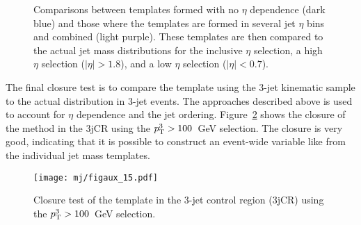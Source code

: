 \begin{figure}[!ht]
  \centering
  
    
  \caption{Comparisons between templates formed with no $\eta$ dependence (dark blue) and those where the templates are formed in several jet $\eta$ bins and combined (light purple). These templates are then compared to the actual jet mass distributions for the
            inclusive $\eta$ selection, 
            a high $\eta$ selection ($|\eta|>1.8$), and
            a low $\eta$ selection ($|\eta|<0.7$).
          }
           
  \label{fig:search:search:background:closure:eta}
\end{figure} 

The final closure test is to compare the \MJ template using the 3-jet kinematic sample to the actual \MJ distribution in 3-jet events. The approaches described above is used to account for $\eta$ dependence and the jet ordering. Figure~\ref{fig:search:search:background:closure:MJ} shows the closure of the method in the 3jCR using the $p_{\text{T}}^{3}>100$~GeV selection. The closure is very good, indicating that it is possible to construct an event-wide variable like \MJ from the individual jet mass templates.

\begin{figure}[!ht]
  \centering
  \texttt{[image: mj/figaux\_15.pdf]}
  \caption{Closure test of the \MJ template in the 3-jet control region (3jCR) using the $p_{\text{T}}^{3}>100$~GeV selection.}
  \label{fig:search:search:background:closure:MJ}
\end{figure}



